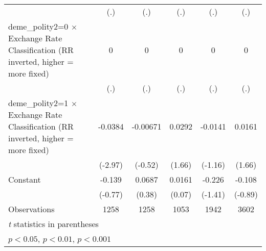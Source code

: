 {\begin{tabular*}{\linewidth}{@{\hskip\tabcolsep\extracolsep\fill}l*{5}{c}}
                &      (.)         &      (.)         &      (.)         &      (.)         &      (.)         \\
\addlinespace
deme\_polity2=0 $\times$ Exchange Rate Classification (RR inverted, higher = more fixed)&        0         &        0         &        0         &        0         &        0         \\
                &      (.)         &      (.)         &      (.)         &      (.)         &      (.)         \\
\addlinespace
deme\_polity2=1 $\times$ Exchange Rate Classification (RR inverted, higher = more fixed)&  -0.0384\sym{**} & -0.00671         &   0.0292         &  -0.0141         &   0.0161         \\
                &  (-2.97)         &  (-0.52)         &   (1.66)         &  (-1.16)         &   (1.66)         \\
\addlinespace
Constant        &   -0.139         &   0.0687         &   0.0161         &   -0.226         &   -0.108         \\
                &  (-0.77)         &   (0.38)         &   (0.07)         &  (-1.41)         &  (-0.89)         \\
\midrule
Observations    &     1258         &     1258         &     1053         &     1942         &     3602         \\
\bottomrule
\multicolumn{6}{l}{\footnotesize \textit{t} statistics in parentheses}\\
\multicolumn{6}{l}{\footnotesize \sym{*} \(p<0.05\), \sym{**} \(p<0.01\), \sym{***} \(p<0.001\)}\\
\end{tabular*}
}
